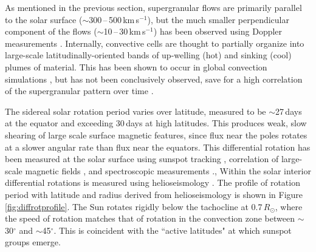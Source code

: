 As mentioned in the previous section, supergranular flows are primarily parallel to the solar surface ($\sim$300\,--\,500\,km\,s$^{-1}$), but the much smaller perpendicular component of the flows ($\sim$10\,--\,30\,km\,s$^{-1}$) has been observed using Doppler measurements \citep{Hathaway:2002,Duvall:2010}.
Internally, convective cells are thought to partially organize into large-scale latitudinally-oriented bands of up-welling (hot) and sinking (cool) plumes of material. This has been shown to occur in global convection simulations \citep{Brun:2004}, but has not been conclusively observed, save for a high correlation of the supergranular pattern over time \citep{Miesch:2005}. 



The sidereal solar rotation period varies over latitude, measured to be $\sim$27\,days at the equator and exceeding 30\,days at high latitudes. This produces weak, slow shearing of large scale surface magnetic features, since flux near the poles rotates at a slower angular rate than flux near the equators. This differential rotation has been measured at the solar surface using sunspot tracking \citep{Newton:1951}, correlation of large-scale magnetic fields \citep{Wilcox:1970}, and spectroscopic measurements \citep{Howard:1970}., Within the solar interior differential rotations is measured using helioseismology \citep{Schou:1998}. The profile of rotation period with latitude and radius derived from helioseismology is shown in Figure \ref{fig:diffrotprofile}. The Sun rotates rigidly  below the tachocline at 0.7\,$R_\odot$, where the speed of rotation matches that of rotation in the convection zone between $\sim$30$^{\circ}$ and $\sim$45$^{\circ}$. This is coincident with the ``active latitudes" at which sunspot groups emerge. 

